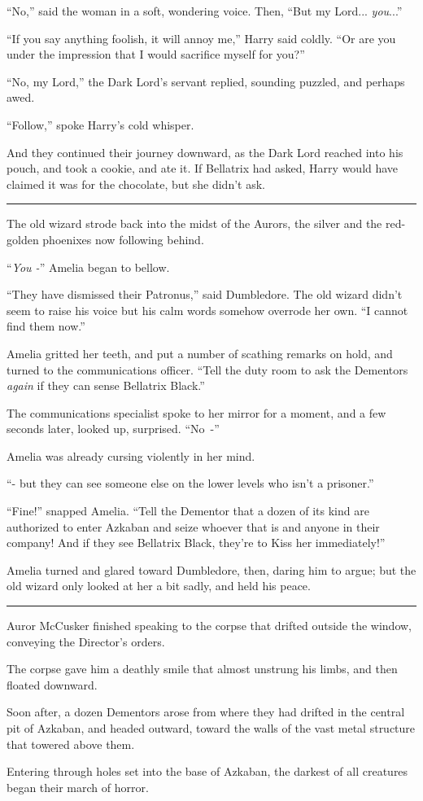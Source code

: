 ``No,'' said the woman in a soft, wondering voice. Then, ``But my Lord... \emph{you}...''

``If you say anything foolish, it will annoy me,'' Harry said coldly. ``Or are you under the impression that I would sacrifice myself for you?''

``No, my Lord,'' the Dark Lord's servant replied, sounding puzzled, and perhaps awed.

``Follow,'' spoke Harry's cold whisper.

And they continued their journey downward, as the Dark Lord reached into his pouch, and took a cookie, and ate it. If Bellatrix had asked, Harry would have claimed it was for the chocolate, but she didn't ask.

\begin{center}\rule{3in}{0.4pt}\end{center}

The old wizard strode back into the midst of the Aurors, the silver and the red-golden phoenixes now following behind.

``\emph{You -}'' Amelia began to bellow.

``They have dismissed their Patronus,'' said Dumbledore. The old wizard didn't seem to raise his voice but his calm words somehow overrode her own. ``I cannot find them now.''

Amelia gritted her teeth, and put a number of scathing remarks on hold, and turned to the communications officer. ``Tell the duty room to ask the Dementors \emph{again} if they can sense Bellatrix Black.''

The communications specialist spoke to her mirror for a moment, and a few seconds later, looked up, surprised. ``No~-''

Amelia was already cursing violently in her mind.

``- but they can see someone else on the lower levels who isn't a prisoner.''

``Fine!'' snapped Amelia. ``Tell the Dementor that a dozen of its kind are authorized to enter Azkaban and seize whoever that is and anyone in their company! And if they see Bellatrix Black, they're to Kiss her immediately!''

Amelia turned and glared toward Dumbledore, then, daring him to argue; but the old wizard only looked at her a bit sadly, and held his peace.

\begin{center}\rule{3in}{0.4pt}\end{center}

Auror McCusker finished speaking to the corpse that drifted outside the window, conveying the Director's orders.

The corpse gave him a deathly smile that almost unstrung his limbs, and then floated downward.

Soon after, a dozen Dementors arose from where they had drifted in the central pit of Azkaban, and headed outward, toward the walls of the vast metal structure that towered above them.

Entering through holes set into the base of Azkaban, the darkest of all creatures began their march of horror.
